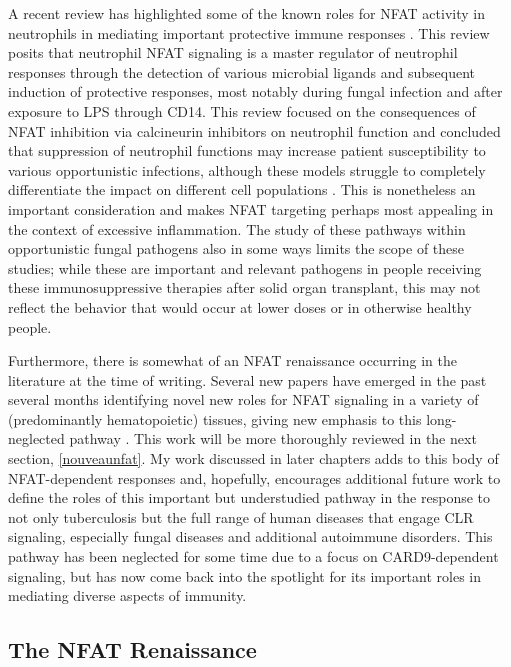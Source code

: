 A recent review has highlighted some of the known roles for NFAT activity in neutrophils in mediating important protective immune responses \citep{Vymazal2021}. This review posits that neutrophil NFAT signaling is a master regulator of neutrophil responses through the detection of various microbial ligands and subsequent induction of protective responses, most notably during fungal infection and after exposure to LPS through CD14. This review focused on the consequences of NFAT inhibition via calcineurin inhibitors on neutrophil function and concluded that suppression of neutrophil functions may increase patient susceptibility to various opportunistic infections, although these models struggle to completely differentiate the impact on different cell populations \citep{Herbst2013}. This is nonetheless an important consideration and makes NFAT targeting perhaps most appealing in the context of excessive inflammation. The study of these pathways within opportunistic fungal pathogens also in some ways limits the scope of these studies; while these are important and relevant pathogens in people receiving these immunosuppressive therapies after solid organ transplant, this may not reflect the behavior that would occur at lower doses or in otherwise healthy people.

Furthermore, there is somewhat of an NFAT renaissance occurring in the literature at the time of writing. Several new papers have emerged in the past several months identifying novel new roles for NFAT signaling in a variety of (predominantly hematopoietic) tissues, giving new emphasis to this long\hyp{}neglected pathway \citep{Deerhake2021, Poli2022, Peuker2022}. This work will be more thoroughly reviewed in the next section, \autoref{nouveaunfat}. My work discussed in later chapters adds to this body of NFAT\hyp{}dependent responses and, hopefully, encourages additional future work to define the roles of this important but understudied pathway in the response to not only tuberculosis but the full range of human diseases that engage CLR signaling, especially fungal diseases and additional autoimmune disorders. This pathway has been neglected for some time due to a focus on CARD9-dependent signaling, but has now come back into the spotlight for its important roles in mediating diverse aspects of immunity. 

\subsection{The NFAT Renaissance}\label{nouveaunfat}

